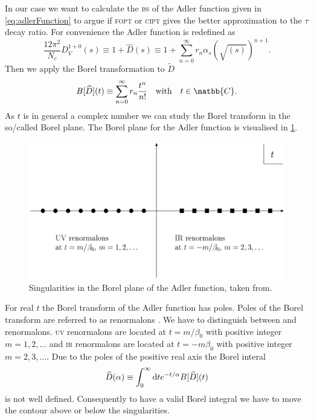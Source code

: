 \documentclass[../../index.tex]{subfiles}
\begin{document}
In our case we want to calculate the \textsc{bs} of the Adler function given in
\cref{eq:adlerFunction} to argue if \textsc{fopt} or \textsc{cipt} gives the
better approximation to the \(\tau\) decay ratio. For convenience the Adler
function is redefined as
\begin{equation}
  \frac{12 \pi^2}{N_c} D_V^{1+0}(s) \equiv 1 + \widehat D(s) \equiv 1 + \sum_{n=0}^{\infty} r_n \alpha_s(\sqrt{(s)})^{n+1}.
\end{equation}
Then we apply the Borel transformation to \(\widetilde D\)
\begin{equation}
  B[\widehat D](t) \equiv \sum_{n=0}^{\infty} r_n \frac{t^n}{n!} \quad \text{with} \quad t \in \matbb{C}.
\end{equation}
As \(t\) is in general a complex number we can study the Borel transform in
the so\-/called Borel plane. The Borel plane for the Adler function is
visualised in \cref{fig:borelPlane}.
\begin{figure}
  \centering \includegraphics[width=\textwidth]{./images/borelPlane.eps}
  \caption{Singularities in the Borel plane of the Adler function, taken
    from\cite{Beneke1998}.}
  \label{fig:borelPlane}
\end{figure}
For real \(t\) the Borel transform of the Adler function has poles. Poles of
the Borel transform are referred to as renormalons \cite{Beneke1999,
  Zichichi1979}. We have to distinguish between  and
 renormalons. \textsc{uv} renormalons are located at
\(t=m/\beta_0\) with positive integer \(m=1,2,\dots\) and \textsc{ir}
renormalons are located at \(t=-m\beta_0\) with positive integer
\(m=2,3,\dots\). Due to the poles of the positive real axis the Borel interal
\begin{equation}
  \widehat D(\alpha) \equiv \int_0^\infty \dif t e^{-t/\alpha} B[\widehat D](t)
\end{equation}
is not well defined. Consequently to have a valid Borel integral we have to
move the contour above or below the singularities.
\end{document}
